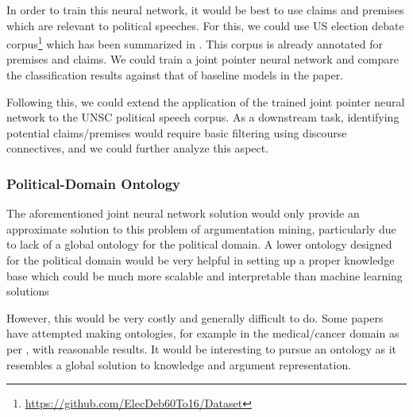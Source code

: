 \documentclass[12pt,a4paper]{article}
\begin{document}
In order to train this neural network, it would be best to use claims and
premises which are relevant to political speeches. For this, we could use US
election debate corpus\footnote{\url{https://github.com/ElecDeb60To16/Dataset}}
which has been summarized in \citet{haddadan-etal-2019-yes}. This corpus is
already annotated for premises and claims. We could train a joint pointer neural
network and compare the classification results against that of baseline models
in the paper.

Following this, we could extend the application of the trained joint pointer
neural network to the UNSC political speech corpus. As a downstream task,
identifying potential claims/premises would require basic filtering using
discourse connectives, and we could further analyze this aspect.

\subsubsection{Political-Domain Ontology}

The aforementioned joint neural network solution would only provide an
approximate solution to this problem of argumentation mining, particularly due to
lack of a global ontology for the political domain. A lower ontology designed for the political domain would be very helpful in setting up a proper knowledge base which could be much more scalable and interpretable than machine learning solutions

However, this would be very costly and generally difficult to do. Some papers
have attempted making ontologies, for example in the medical/cancer domain as
per \citet{ontology}, with reasonable results. It would be interesting to
pursue an ontology as it resembles a global solution to knowledge and argument representation. 

\newpage


\nocite{*}
\end{document}
